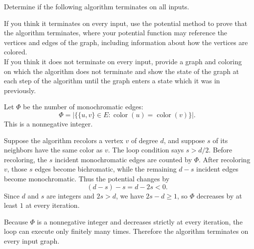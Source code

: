 \documentclass[11pt,addpoints,answers]{exam}
\theoremstyle{plain}            %
\theoremstyle{definition}       %
\theoremstyle{remark}           %
\DeclareMathOperator{\col}{color}
\begin{document}
\begin{questions}
    Determine if the following algorithm terminates on all inputs. 


    \begin{minipage}{\linewidth}
    \begin{algorithm}[H]
    \begin{algorithmic}[1]
        \Statex{}
        \EndFor
        \Statex{}
        \EndWhile
        \EndFunction
    \end{algorithmic}
    \end{algorithm}
    \end{minipage}

    
    If you think it terminates on every input, use the potential method to prove that the algorithm terminates, where your potential function may reference the vertices and edges of the graph, including information about how the vertices are colored.\\
    If you think it does not terminate on every input, provide a graph and coloring on which the algorithm does not terminate and show the state of the graph at each step of the algorithm until the graph enters a state which it was in previously.


    \begin{solution}
Let \(\Phi\) be the number of monochromatic edges:
\[
\Phi=\left|\{\{u,v\}\in E:\col(u)=\col(v)\}\right|.
\]
This is a nonnegative integer.

Suppose the algorithm recolors a vertex \(v\) of degree \(d\), and suppose \(s\) of its neighbors have the same color as \(v\). The loop condition says \(s>d/2\). Before recoloring, the \(s\) incident monochromatic edges are counted by \(\Phi\). After recoloring \(v\), those \(s\) edges become bichromatic, while the remaining \(d-s\) incident edges become monochromatic. Thus the potential changes by
\[
(d-s)-s=d-2s<0.
\]
Since \(d\) and \(s\) are integers and \(2s>d\), we have \(2s-d\ge1\), so \(\Phi\) decreases by at least \(1\) at every iteration.

Because \(\Phi\) is a nonnegative integer and decreases strictly at every iteration, the loop can execute only finitely many times. Therefore the algorithm terminates on every input graph.
\end{solution}



\end{questions}
\end{document}
